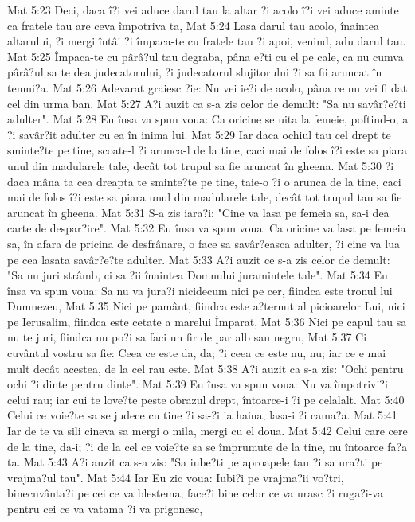 Mat 5:23  Deci, daca î?i vei aduce darul tau la altar ?i acolo î?i vei aduce aminte ca fratele tau are ceva împotriva ta,
Mat 5:24  Lasa darul tau acolo, înaintea altarului, ?i mergi întâi ?i împaca-te cu fratele tau ?i apoi, venind, adu darul tau.
Mat 5:25  Împaca-te cu pârâ?ul tau degraba, pâna e?ti cu el pe cale, ca nu cumva pârâ?ul sa te dea judecatorului, ?i judecatorul slujitorului ?i sa fii aruncat în temni?a.
Mat 5:26  Adevarat graiesc ?ie: Nu vei ie?i de acolo, pâna ce nu vei fi dat cel din urma ban.
Mat 5:27  A?i auzit ca s-a zis celor de demult: "Sa nu savâr?e?ti adulter".
Mat 5:28  Eu însa va spun voua: Ca oricine se uita la femeie, poftind-o, a ?i savâr?it adulter cu ea în inima lui.
Mat 5:29  Iar daca ochiul tau cel drept te sminte?te pe tine, scoate-l ?i arunca-l de la tine, caci mai de folos î?i este sa piara unul din madularele tale, decât tot trupul sa fie aruncat în gheena.
Mat 5:30  ?i daca mâna ta cea dreapta te sminte?te pe tine, taie-o ?i o arunca de la tine, caci mai de folos î?i este sa piara unul din madularele tale, decât tot trupul tau sa fie aruncat în gheena.
Mat 5:31  S-a zis iara?i: "Cine va lasa pe femeia sa, sa-i dea carte de despar?ire".
Mat 5:32  Eu însa va spun voua: Ca oricine va lasa pe femeia sa, în afara de pricina de desfrânare, o face sa savâr?easca adulter, ?i cine va lua pe cea lasata savâr?e?te adulter.
Mat 5:33  A?i auzit ce s-a zis celor de demult: "Sa nu juri strâmb, ci sa ?ii înaintea Domnului juramintele tale".
Mat 5:34  Eu însa va spun voua: Sa nu va jura?i nicidecum nici pe cer, fiindca este tronul lui Dumnezeu,
Mat 5:35  Nici pe pamânt, fiindca este a?ternut al picioarelor Lui, nici pe Ierusalim, fiindca este cetate a marelui Împarat,
Mat 5:36  Nici pe capul tau sa nu te juri, fiindca nu po?i sa faci un fir de par alb sau negru,
Mat 5:37  Ci cuvântul vostru sa fie: Ceea ce este da, da; ?i ceea ce este nu, nu; iar ce e mai mult decât acestea, de la cel rau este.
Mat 5:38  A?i auzit ca s-a zis: "Ochi pentru ochi ?i dinte pentru dinte".
Mat 5:39  Eu însa va spun voua: Nu va împotrivi?i celui rau; iar cui te love?te peste obrazul drept, întoarce-i ?i pe celalalt.
Mat 5:40  Celui ce voie?te sa se judece cu tine ?i sa-?i ia haina, lasa-i ?i cama?a.
Mat 5:41  Iar de te va sili cineva sa mergi o mila, mergi cu el doua.
Mat 5:42  Celui care cere de la tine, da-i; ?i de la cel ce voie?te sa se împrumute de la tine, nu întoarce fa?a ta.
Mat 5:43  A?i auzit ca s-a zis: "Sa iube?ti pe aproapele tau ?i sa ura?ti pe vrajma?ul tau".
Mat 5:44  Iar Eu zic voua: Iubi?i pe vrajma?ii vo?tri, binecuvânta?i pe cei ce va blestema, face?i bine celor ce va urasc ?i ruga?i-va pentru cei ce va vatama ?i va prigonesc,
